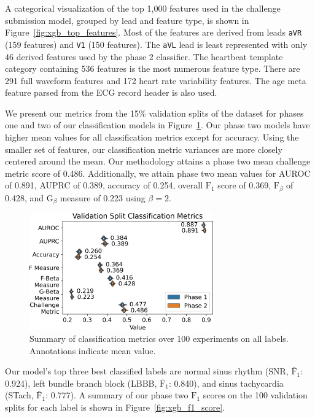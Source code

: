 \documentclass[\main/thesis.tex]{subfiles}
\begin{document}
A categorical visualization of the top 1,000 features used in the challenge submission model, grouped by lead and feature type, is shown in Figure~\ref{fig:xgb_top_features}.
Most of the features are derived from leads \texttt{aVR} (159 features) and \texttt{V1} (150 features).
The \texttt{aVL} lead is least represented with only 46 derived features used by the phase 2 classifier.
The heartbeat template category containing 536 features is the most numerous feature type.
There are 291 full waveform features and 172 heart rate variability features.
The age meta feature parsed from the ECG record header is also used.

We present our metrics from the 15\% validation splits of the dataset for phases one and two of our classification models in Figure~\ref{fig:xgb_classification_metrics_summary}.
Our phase two models have higher mean values for all classification metrics except for accuracy.
Using the smaller set of features, our classification metric variances are more closely centered around the mean.
Our methodology attains a phase two mean challenge metric score of 0.486.
Additionally, we attain phase two mean values for AUROC of 0.891, AUPRC of 0.389, accuracy of 0.254, overall $\text{F}_1$ score of 0.369, $\text{F}_\beta$ of 0.428, and $\text{G}_\beta$ measure of 0.223 using $\beta = 2$.

\begin{figure}[hb]
  \centering
  \includegraphics[width=7.9cm]{figure/xgb_classification_metrics_phase_1_2.png}
  \caption[Manual feature engineering with gradient boosting decision tree classification metrics summary on validation set.]{Summary of classification metrics over 100 experiments on all labels. Annotations indicate mean value.}
  \label{fig:xgb_classification_metrics_summary}
\end{figure}

Our model's top three best classified labels are normal sinus rhythm (SNR, $\bar{\text{F}}_1$: 0.924), left bundle branch block (LBBB, $\bar{\text{F}}_1$: 0.840), and sinus tachycardia (STach, $\bar{\text{F}}_1$: 0.777).
A summary of our phase two $\text{F}_1$ scores on the 100 validation splits for each label is shown in Figure~\ref{fig:xgb_f1_score}.
\end{document}
